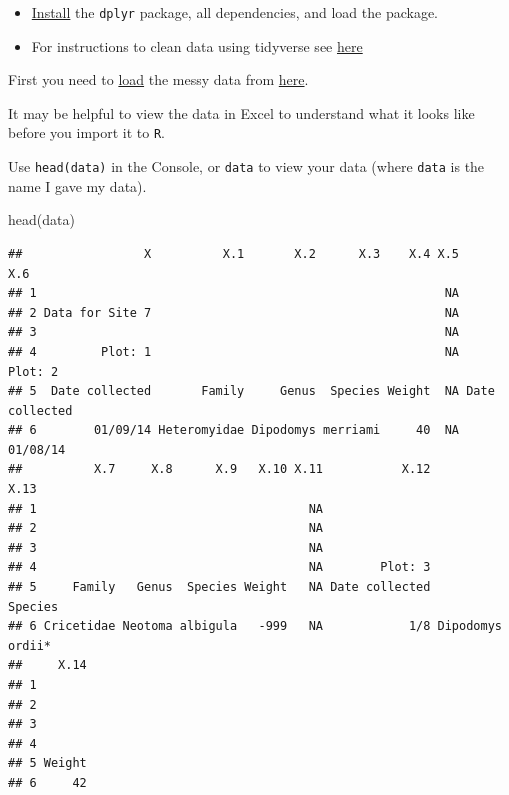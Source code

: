 \documentclass[
]{book}
\newenvironment{Shaded}{\begin{snugshade}}{\end{snugshade}}
\newcommand{\FunctionTok}[1]{\textcolor[rgb]{0.00,0.00,0.00}{#1}}
\newcommand{\NormalTok}[1]{#1}
\begin{document}
\begin{itemize}
\item
  \href{https://ahurford.github.io/quant-guide-all-courses/install.html}{Install} the \texttt{dplyr} package, all dependencies, and load the package.
\item
  For instructions to clean data using tidyverse see \href{https://ahurford.github.io/quant-guide-all-courses/handling-data.html\#dplyr}{here}
\end{itemize}

First you need to \href{https://ahurford.github.io/quant-guide-all-courses/data-entry.html\#loading-or-importing-data}{load} the messy data from \href{https://datacarpentry.org/semester-biology/exercises/Tidy-data-improving-messy-data-SQL/}{here}.

It may be helpful to view the data in Excel to understand what it looks like before you import it to \texttt{R}.

Use \texttt{head(data)} in the Console, or \texttt{data} to view your data (where \texttt{data} is the name I gave my data).

\begin{Shaded}
\begin{Highlighting}[]
\FunctionTok{head}\NormalTok{(data)}
\end{Highlighting}
\end{Shaded}

\begin{verbatim}
##                 X          X.1       X.2      X.3    X.4 X.5            X.6
## 1                                                         NA               
## 2 Data for Site 7                                         NA               
## 3                                                         NA               
## 4         Plot: 1                                         NA        Plot: 2
## 5  Date collected       Family     Genus  Species Weight  NA Date collected
## 6        01/09/14 Heteromyidae Dipodomys merriami     40  NA       01/08/14
##          X.7     X.8      X.9   X.10 X.11           X.12             X.13
## 1                                      NA                                
## 2                                      NA                                
## 3                                      NA                                
## 4                                      NA        Plot: 3                 
## 5     Family   Genus  Species Weight   NA Date collected          Species
## 6 Cricetidae Neotoma albigula   -999   NA            1/8 Dipodomys ordii*
##     X.14
## 1       
## 2       
## 3       
## 4       
## 5 Weight
## 6     42
\end{verbatim}
\end{document}
